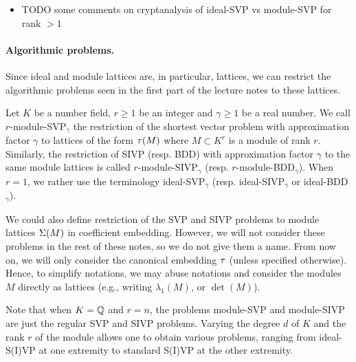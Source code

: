 \begin{itemize}
\item {\color{red} TODO} some comments on cryptanalysis of ideal-SVP vs module-SVP for rank $> 1$
\end{itemize}

\paragraph{Algorithmic problems.} Since ideal and module lattices are, in particular, lattices, we can restrict the algorithmic problems seen in the first part of the lecture notes to these lattices.

\begin{definition}
Let $K$ be a number field, $r \geq 1$ be an integer and $\gamma \geq 1$ be a real number. We call $r$-module-SVP$_\gamma$ the restriction of the shortest vector problem with approximation factor $\gamma$ to lattices of the form $\tau(M)$ where $M \subset K^r$ is a module of rank $r$.
Similarly, the restriction of SIVP (resp. BDD) with approximation factor $\gamma$ to the same module lattices is called $r$-module-SIVP$_\gamma$ (resp. $r$-module-BDD$_\gamma$).
When $r = 1$, we rather use the terminology ideal-SVP$_\gamma$ (resp. ideal-SIVP$_\gamma$ or ideal-BDD$_\gamma$).
\end{definition}

We could also define restriction of the SVP and SIVP problems to module lattices $\Sigma(M)$ in coefficient embedding. However, we will not consider these problems in the rest of these notes, so we do not give them a name. From now on, we will only consider the canonical embedding $\tau$ (unless specified otherwise). Hence, to simplify notations, we may abuse notations and consider the modules $M$ directly as lattices (e.g., writing $\lambda_1(M)$, or $\det(M)$).

Note that when $K = \mathbb{Q}$ and $r = n$, the problems module-SVP and module-SIVP are just the regular SVP and SIVP problems. Varying the degree $d$ of $K$ and the rank $r$ of the module allows one to obtain various problems, ranging from ideal-S(I)VP at one extremity to standard S(I)VP at the other extremity.

